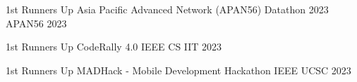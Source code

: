 










\begin{cvhonors}

  \cvhonor
  {1st Runners Up} %
  {Asia Pacific Advanced Network (APAN56) Datathon 2023} %
  {APAN56} %
  {2023} %

  \cvhonor
  {1st Runners Up} %
  {CodeRally 4.0} %
  {IEEE CS IIT} %
  {2023} %


  \cvhonor
  {1st Runners Up} %
  {MADHack - Mobile Development Hackathon} %
  {IEEE UCSC} %
  {2023} %

\end{cvhonors}



